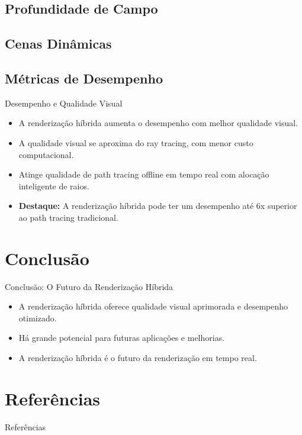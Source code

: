 \documentclass[aspectratio=169,xcolor=table]{beamer}
\begin{document}
\subsection{Profundidade de Campo}
\subsection{Cenas Dinâmicas}
\subsection{Métricas de Desempenho}

\begin{frame}{Desempenho e Qualidade Visual}
    \begin{itemize}
        \item A renderização híbrida aumenta o desempenho com melhor qualidade visual.
        \item A qualidade visual se aproxima do ray tracing, com menor custo computacional.
        \item Atinge qualidade de path tracing offline em tempo real com alocação inteligente de raios.
        \item \textbf{Destaque:} A renderização híbrida pode ter um desempenho até 6x superior ao path tracing tradicional.
    \end{itemize}
    \begin{center}
    \end{center}
\end{frame}

\section{Conclusão}
\begin{frame}{Conclusão: O Futuro da Renderização Híbrida}
    \begin{itemize}
        \item A renderização híbrida oferece qualidade visual aprimorada e desempenho otimizado.
        \item Há grande potencial para futuras aplicações e melhorias.
        \item A renderização híbrida é o futuro da renderização em tempo real.
    \end{itemize}
    \begin{center}
    \end{center}
\end{frame}

\section{Referências}
\begin{frame}[allowframebreaks]{Referências}
    \nocite{*}
    \printbibliography[heading=none]
\end{frame}
\end{document}
